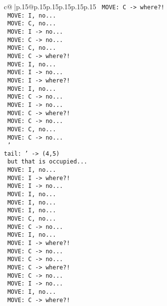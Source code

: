 \documentclass{article}
\begin{document}
{\begin{supertabular}{c@{$\;$}|p{.15\linewidth}@{}p{.15\linewidth}p{.15\linewidth}p{.15\linewidth}p{.15\linewidth}p{.15\linewidth}}
{{{\texttt{ MOVE: C {-}> where?!} \\
\texttt{ MOVE: I, no...} \\
\texttt{ MOVE: C, no...} \\
\texttt{ MOVE: I {-}> no...} \\
\texttt{ MOVE: C {-}> no...} \\
\texttt{ MOVE: C, no...} \\
\texttt{ MOVE: C {-}> where?!} \\
\texttt{ MOVE: I, no...} \\
\texttt{ MOVE: I {-}> no...} \\
\texttt{ MOVE: I {-}> where?!} \\
\texttt{ MOVE: I, no...} \\
\texttt{ MOVE: C {-}> no...} \\
\texttt{ MOVE: I {-}> no...} \\
\texttt{ MOVE: C {-}> where?!} \\
\texttt{ MOVE: C {-}> no...} \\
\texttt{ MOVE: C, no...} \\
\texttt{ MOVE: C {-}> no...} \\
\texttt{ '} \\
\texttt{tail: ' {-}> (4,5) } \\
\texttt{ but that is occupied...} \\
\texttt{ MOVE: I, no...} \\
\texttt{ MOVE: I {-}> where?!} \\
\texttt{ MOVE: I {-}> no...} \\
\texttt{ MOVE: I, no...} \\
\texttt{ MOVE: I, no...} \\
\texttt{ MOVE: I, no...} \\
\texttt{ MOVE: C, no...} \\
\texttt{ MOVE: C {-}> no...} \\
\texttt{ MOVE: I, no...} \\
\texttt{ MOVE: I {-}> where?!} \\
\texttt{ MOVE: C {-}> no...} \\
\texttt{ MOVE: C {-}> no...} \\
\texttt{ MOVE: C {-}> where?!} \\
\texttt{ MOVE: C {-}> no...} \\
\texttt{ MOVE: I {-}> no...} \\
\texttt{ MOVE: I, no...} \\
\texttt{ MOVE: C {-}> where?!} \\
}}}
\end{supertabular}}
\end{document}
